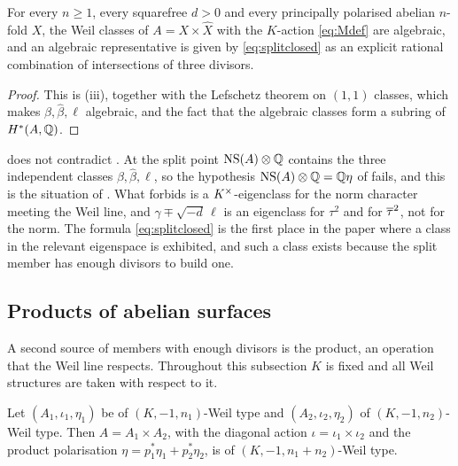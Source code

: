 \begin{corollary}\label{cor:splitalgebraic}
For every $n\ge1$, every squarefree $d>0$ and every principally polarised
abelian $n$-fold $X$, the Weil classes of $A=X\times\widehat{X}$ with the
$K$-action \eqref{eq:Mdef} are algebraic, and an algebraic representative is
given by \eqref{eq:splitclosed} as an explicit rational combination of
intersections of three divisors.
\end{corollary}

\begin{proof}
This is (iii), together with the Lefschetz theorem on
$(1,1)$ classes, which makes $\beta,\widehat{\beta},\ell$ algebraic, and the
fact that the algebraic classes form a subring of $H^{*}(A,\mathbb{Q})$.
\end{proof}

\begin{remark}\label{rem:splitconsistent}
 does not contradict . At the
split point $\mathrm{NS}(A)\otimes\mathbb{Q}$ contains the three independent classes
$\beta,\widehat{\beta},\ell$, so the hypothesis
$\mathrm{NS}(A)\otimes\mathbb{Q}=\mathbb{Q}\eta$ of  fails, and this is the
situation of . What  forbids is a
$K^{\times}$-eigenclass for the norm character meeting the Weil line, and
$\gamma\mp\sqrt{-d}\,\ell$ is an eigenclass for $\tau^{2}$ and for
$\overline{\tau}^{2}$, not for the norm. The formula \eqref{eq:splitclosed} is
the first place in the paper where a class in the relevant eigenspace is
exhibited, and such a class exists because the split member has enough
divisors to build one.
\end{remark}

\subsection{Products of abelian surfaces}\label{ssec:products}

A second source of members with enough divisors is the product, an operation
that the Weil line respects. Throughout this subsection $K$ is fixed and all
Weil structures are taken with respect to it.

\begin{lemma}\label{lem:prodweil}
Let $(A_{1},\iota_{1},\eta_{1})$ be of $(K,-1,n_{1})$-Weil type and
$(A_{2},\iota_{2},\eta_{2})$ of $(K,-1,n_{2})$-Weil type. Then
$A=A_{1}\times A_{2}$, with the diagonal action
$\iota=\iota_{1}\times\iota_{2}$ and the product polarisation
$\eta=p_{1}^{*}\eta_{1}+p_{2}^{*}\eta_{2}$, is of
$(K,-1,n_{1}+n_{2})$-Weil type.
\end{lemma}

